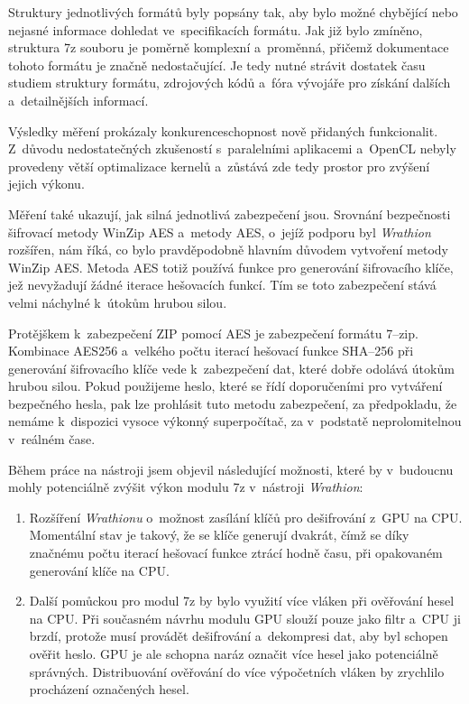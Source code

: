  Struktury jednotlivých formátů byly popsány tak, aby bylo možné chybějící nebo nejasné informace
dohledat ve~specifikacích formátu. Jak již bylo zmíněno, struktura 7z souboru je poměrně
komplexní a~proměnná, přičemž dokumentace tohoto formátu je značně nedostačující. Je tedy
nutné strávit dostatek času studiem struktury formátu, zdrojových kódů a~fóra vývojáře pro získání dalších a~detailnějších informací.

 Výsledky měření prokázaly konkurenceschopnost nově přidaných funkcionalit. Z~důvodu
nedostatečných zkušeností s~paralelními aplikacemi a~OpenCL nebyly provedeny větší
optimalizace kernelů a~zůstává zde tedy prostor pro zvýšení jejich výkonu. 

Měření také ukazují, jak silná jednotlivá zabezpečení jsou. Srovnání bezpečnosti šifrovací
metody WinZip AES a~metody AES, o~jejíž podporu byl {\it Wrathion} rozšířen, nám říká, co bylo
pravděpodobně hlavním důvodem vytvoření metody WinZip AES. Metoda AES totiž používá funkce pro
generování šifrovacího klíče, jež nevyžadují žádné iterace hešovacích funkcí. Tím se toto
zabezpečení stává velmi náchylné k~útokům hrubou silou.

Protějškem k~zabezpečení ZIP pomocí AES je zabezpečení formátu 7--zip. Kombinace AES256 a~velkého
počtu iterací hešovací funkce SHA--256 při generování šifrovacího klíče vede k~zabezpečení dat,
které dobře odolává útokům hrubou silou. Pokud použijeme heslo, které se řídí doporučeními pro
vytváření bezpečného hesla, pak lze prohlásit tuto metodu zabezpečení, za předpokladu, že nemáme
k~dispozici vysoce výkonný superpočítač, za v~podstatě neprolomitelnou v~reálném čase.

Během práce na nástroji jsem objevil následující možnosti, které by v~budoucnu mohly potenciálně
zvýšit výkon modulu 7z v~nástroji {\it Wrathion}:
\begin{enumerate}
   \item Rozšíření {\it Wrathionu} o~možnost zasílání klíčů pro dešifrování z~GPU na CPU. Momentální
       stav je takový, že se klíče generují dvakrát, čímž se díky značnému počtu iterací hešovací
       funkce ztrácí hodně času, při opakovaném generování klíče na CPU.
    \item Další pomůckou pro modul 7z by bylo využití více vláken při ověřování hesel na
	CPU. Při současném návrhu modulu GPU slouží pouze jako filtr a~CPU ji brzdí, protože musí
	provádět dešifrování a~dekompresi dat, aby byl schopen ověřit heslo. GPU je ale schopna
	naráz označit více hesel jako potenciálně správných. Distribuování ověřování do
	více výpočetních vláken by zrychlilo procházení označených hesel.
\end{enumerate}
